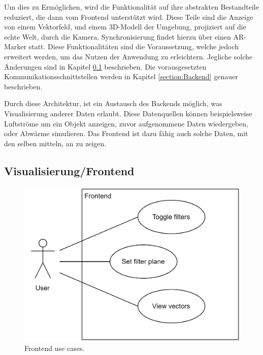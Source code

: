 Um dies zu Ermöglichen, wird die Funktionalität auf ihre abstrakten
Bestandteile reduziert, die dann vom Frontend unterstützt wird.
Diese Teile sind die Anzeige von einem Vektorfeld, und einem
3D-Modell der Umgebung, projiziert auf die echte Welt, durch die
Kamera. Synchronisierung findet hierzu über einen AR-Marker statt.
Diese Funktionalitäten sind die Voraussetzung, welche jedoch
erweitert werden, um das Nutzen der Anwendung zu erleichtern.
Jegliche solche Änderungen sind in Kapitel \ref{section:Frontend}
beschrieben. Die vorausgesetzten Kommunikationsschnittstellen werden
in Kapitel \ref{section:Backend} genauer beschrieben.

Durch diese Architektur, ist ein Austausch des Backends möglich,
was Visualisierung anderer Daten erlaubt. Diese Datenquellen können
beispielsweise Luftströme um ein Objekt anzeigen, zuvor aufgenommene
Daten wiedergeben, oder Abwärme simulieren. Das Frontend ist dazu
fähig auch solche Daten, mit den selben mitteln, an zu zeigen.



\subsection{Visualisierung/Frontend}
\label{section:Frontend}

\begin{figure}
	\centering
	\includegraphics[width=.75\linewidth]{images/frontend/UseCases}
	\caption{Frontend use cases.}
	\label{fig:frontendUseCase}
\end{figure}


